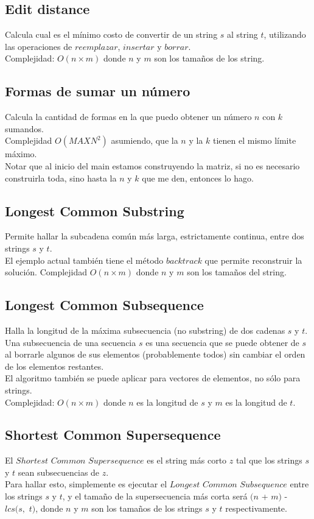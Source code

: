 \documentclass[10pt,letterpaper,twocolumn]{article}
\newcommand{\source}[1]{
  
  \dotfill
}
\begin{document}
  \subsection{Edit distance}
  Calcula cual es el mínimo costo de convertir de un string $s$ al string $t$, utilizando las operaciones de $reemplazar$, $insertar$ y $borrar$.\\
  Complejidad: $O(n \times m)$ donde $n$ y $m$ son los tamaños de los string.
  \source{./src/editDistance.cpp}
  \subsection{Formas de sumar un número}
  Calcula la cantidad de formas en la que puedo obtener un número $n$ con $k$ sumandos.\\
  Complejidad $O(MAXN^2)$ asumiendo, que la $n$ y la $k$ tienen el mismo límite máximo.\\
  Notar que al inicio del main estamos construyendo la matriz, si no es necesario construirla toda, sino hasta la $n$ y $k$ que me den, entonces lo hago.\\
  \source{./src/waysToAdd.cpp}
  \subsection{Longest Common Substring}
  Permite hallar la subcadena común más larga, estrictamente continua, entre dos strings $s$ y $t$.\\
  El ejemplo actual también tiene el método $backtrack$ que permite reconstruir la solución.
  Complejidad $O(n \times m)$ donde $n$ y $m$ son los tamaños del string.
  \source{./src/longestSubString.cpp}
  \subsection{Longest Common Subsequence}
  Halla la longitud de la máxima subsecuencia (no substring) de dos cadenas $s$ y $t$.\\
  Una subsecuencia de una secuencia $s$ es una secuencia que se puede obtener de $s$ al borrarle algunos de sus elementos (probablemente todos) sin cambiar el orden de los elementos restantes.\\
  El algoritmo también se puede aplicar para vectores de elementos, no sólo para strings.\\
  Complejidad: $O(n \times m)$ donde $n$ es la longitud de $s$ y $m$ es la longitud de $t$.\\
  \source{./src/lcs.cpp}
  \subsection{Shortest Common Supersequence}
  El $Shortest$ $Common$ $Supersequence$ es el string más corto $z$ tal que los strings $s$ y $t$ sean subsecuencias de $z$.\\
  Para hallar esto, simplemente es ejecutar el $Longest$ $Common$ $Subsequence$ entre los strings $s$ y $t$, y el tamaño de la supersecuencia más corta será $(n$ + $m)$ - $lcs(s,$ $t)$, donde $n$ y $m$ son los tamaños de los strings $s$ y $t$ respectivamente.
\end{document}
